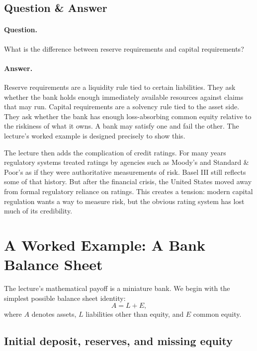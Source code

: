 \subsection{Question \& Answer}

\paragraph{Question.} What is the difference between reserve requirements and capital requirements?

\paragraph{Answer.} Reserve requirements are a liquidity rule tied to certain liabilities. They ask whether the bank holds enough immediately available resources against claims that may run. Capital requirements are a solvency rule tied to the asset side. They ask whether the bank has enough loss-absorbing common equity relative to the riskiness of what it owns. A bank may satisfy one and fail the other. The lecture's worked example is designed precisely to show this.

The lecture then adds the complication of credit ratings. For many years regulatory systems treated ratings by agencies such as Moody's and Standard \& Poor's as if they were authoritative measurements of risk. Basel III still reflects some of that history. But after the financial crisis, the United States moved away from formal regulatory reliance on ratings. This creates a tension: modern capital regulation wants a way to measure risk, but the obvious rating system has lost much of its credibility.

\section{A Worked Example: A Bank Balance Sheet}

The lecture's mathematical payoff is a miniature bank. We begin with the simplest possible balance sheet identity:
\begin{equation}
A = L + E,
\end{equation}
where \(A\) denotes assets, \(L\) liabilities other than equity, and \(E\) common equity.

\subsection{Initial deposit, reserves, and missing equity}

